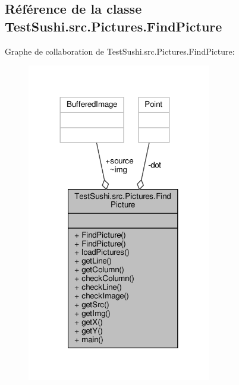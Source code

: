 \hypertarget{classTestSushi_1_1src_1_1Pictures_1_1FindPicture}{}\subsection{Référence de la classe Test\+Sushi.\+src.\+Pictures.\+Find\+Picture}
\label{classTestSushi_1_1src_1_1Pictures_1_1FindPicture}


Graphe de collaboration de Test\+Sushi.\+src.\+Pictures.\+Find\+Picture\+:\nopagebreak
\begin{figure}[H]
\begin{center}
\leavevmode
\includegraphics[width=228pt]{classTestSushi_1_1src_1_1Pictures_1_1FindPicture__coll__graph}
\end{center}
\end{figure}
